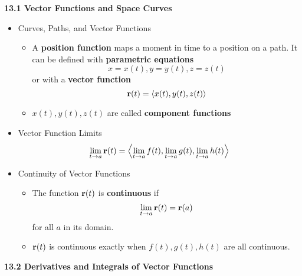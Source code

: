 \newpage

\centerline{\bf 13.1 Vector Functions and Space Curves}

\begin{itemize}
  \item Curves, Paths, and Vector Functions
    \begin{itemize}
      \item A \textbf{position function} maps a moment in time to a position on a path. It can be defined with \textbf{parametric equations} \[x=x(t), y=y(t), z=z(t)\] or with a \textbf{vector function} \[\mathbf{r}(t) = \left<x(t),y(t),z(t)\right>\]
      \item $x(t),y(t),z(t)$ are called \textbf{component functions}
    \end{itemize}

  \item Vector Function Limits
    \[\lim_{t\to a} \mathbf{r}(t) = \left<\lim_{t\to a} f(t), \lim_{t\to a} g(t), \lim_{t\to a} h(t)\right>\]

  \item Continuity of Vector Functions
    \begin{itemize}
      \item
      The function $\mathbf{r}(t)$ is \textbf{continuous} if \[\lim_{t\to a}\mathbf{r}(t) = \mathbf{r}(a)\] for all $a$ in its domain.
      \item $\mathbf{r}(t)$ is continuous exactly when $f(t),g(t),h(t)$ are all continuous.
    \end{itemize}
\end{itemize}

\newpage

\centerline{\bf 13.2 Derivatives and Integrals of Vector Functions}

